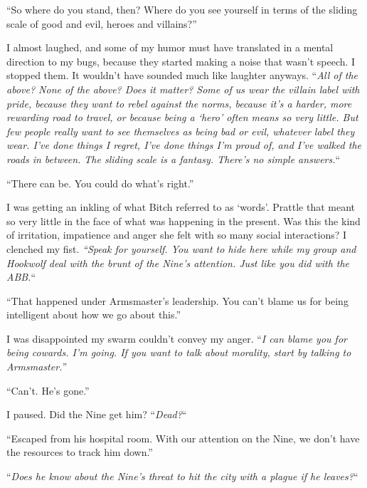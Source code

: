``So where do you stand, then?  Where do you see yourself in terms of the sliding scale of good and evil, heroes and villains?''



I almost laughed, and some of my humor must have translated in a mental direction to my bugs, because they started making a noise that wasn't speech.  I stopped them.  It wouldn't have sounded much like laughter anyways.  ``\emph{All of the above?  None of the above?  Does it matter?  Some of us wear the villain label with pride, because they want to rebel against the norms, because it's a harder, more rewarding road to travel, or because being a `hero' often means so very little.  But few people really want to see themselves as being bad or evil, whatever label they wear.  I've done things I regret, I've done things I'm proud of, and I've walked the roads in between.  The sliding scale is a fantasy.  There's no simple answers.}``



``There can be.  You could do what's right.''



I was getting an inkling of what Bitch referred to as `words'.  Prattle that meant so very little in the face of what was happening in the present.  Was this the kind of irritation, impatience and anger she felt with so many social interactions?  I clenched my fist. \emph{ ``Speak for yourself.  You want to hide here while my group and Hookwolf deal with the brunt of the Nine's attention.  Just like you did with the ABB.}``



``That happened under Armsmaster's leadership.  You can't blame us for being intelligent about how we go about this.''



I was disappointed my swarm couldn't convey my anger.  ``\emph{I can blame you for being cowards.  I'm going.  If you want to talk about morality, start by talking to Armsmaster.''}



``Can't.  He's gone.''



I paused.  Did the Nine get him?  ``\emph{Dead?}``



``Escaped from his hospital room.  With our attention on the Nine, we don't have the resources to track him down.''



``\emph{Does he know about the Nine's threat to hit the city with a plague if he leaves?}``



